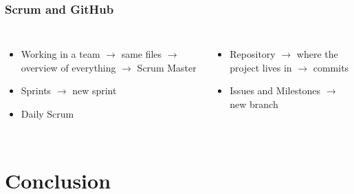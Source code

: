 \documentclass{beamer}
\begin{document}
\begin{frame}
    \frametitle{Scrum and GitHub}
        \begin{columns}
            \center {}
            \begin{itemize}
            \item<1-> Working in a team \linebreak
            $\rightarrow$ same files \linebreak
            $\rightarrow$ overview of everything \linebreak
            $\rightarrow$ Scrum Master
            \item<3-> Sprints \linebreak
            $\rightarrow$ new sprint
            \item<5-> Daily Scrum
            \end{itemize}
            
            \center {}
            \begin{itemize}
            \item<2-> Repository \linebreak
            $\rightarrow$ where the project lives in \linebreak
            $\rightarrow$ commits \linebreak
            \item<4-> Issues and Milestones \linebreak
            $\rightarrow$ new branch \linebreak
            \end{itemize}
        \end{columns}
        \medskip
\end{frame}


\section{Conclusion}
\end{document}
